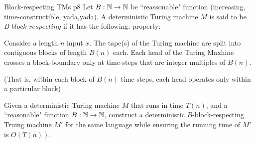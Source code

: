\documentclass[a4paper, 11pt]{article}
\begin{document}
\newpage

\begin{problem}{%
		Block-respecting TMs
	}{p8%
}
Let $B:\mathbb{N}\to\mathbb{N}$ be ``reassonable" function (increasing, time-constructible, yada,yada). A deterministic Turing machine $M$ is said to be $B\textit{-block-respecting}$ if it has the following: property:
\begin{center}
	\begin{minipage}{0.9\textwidth}
		Consider a length $n$ input $x$. The tape(s) of the Turing machine are split into contiguous blocks of length $B(n)$ each. Each head of the Turing Maxhine crosses a block-boundary only at time-steps that are integer multiples of $B(n)$.
		
		(That is, within each block of $B(n)$ time steps, each head operates only within a particular block)
	\end{minipage}
\end{center}

Given a deterministic Turing machine $M$ that runs in time $T(n)$, and a ``reasonable" function $B:\mathbb{N}\to\mathbb{N}$, construct a deterministic $B$-block-respecting Truing machine $M'$ for the same language while ensuring the running time of $M'$ is $O(T(n))$.

\noindent{}
	\end{problem}
\end{document}
